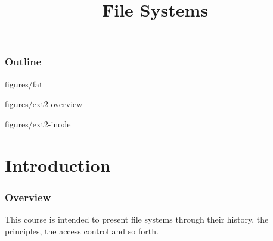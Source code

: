 %
%
%
%
%
%

%
%

%
%

\def\path{../../../..}

%
%



%
%

\title{File Systems}

%
%



%
%

\begin{frame}
  \titlepage
\end{frame}

%
%

\begin{frame}
  \frametitle{Outline}

  \tableofcontents
\end{frame}

%
%

                {figures/fat}

                {figures/ext2-overview}

                {figures/ext2-inode}

%
%

%
%

\section{Introduction}


\begin{frame}
  \frametitle{Overview}

  This course is intended to present file systems through their history,
  the principles, the access control and so forth.
\end{frame}

